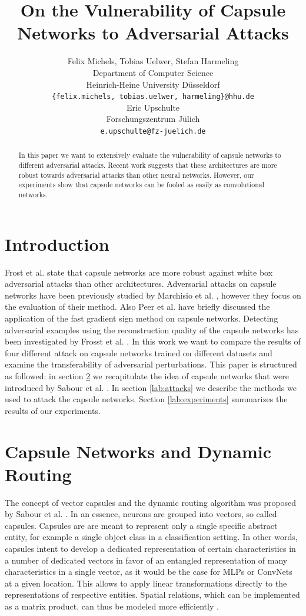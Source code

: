\documentclass{article}
\title{On the Vulnerability of Capsule Networks to Adversarial Attacks}
\author{%
  Felix Michels, Tobias Uelwer, Stefan Harmeling \\
  Department of Computer Science\\
  Heinrich-Heine University Düsseldorf\\
  \texttt{\{felix.michels, tobias.uelwer, harmeling\}@hhu.de} \\
  \And
  Eric Upschulte \\
  Forschungszentrum Jülich \\
  \texttt{e.upschulte@fz-juelich.de} \\
}
\begin{document}
\maketitle

\begin{abstract}
	In this paper we want to extensively evaluate the vulnerability of capsule networks to different adversarial attacks. Recent work suggests that these architectures are more robust towards adversarial attacks than other neural networks. However, our experiments show that capsule networks can be fooled as easily as convolutional networks.

\end{abstract}

\section{Introduction}

Frost et al. \cite{darccc} state that capsule networks are more robust against white box adversarial attacks than other architectures. Adversarial attacks on capsule networks have been previously studied by Marchisio et al. \cite{marchisio}, however they focus on the evaluation of their method. Also Peer et al. \cite{training} have briefly discussed the application of the fast gradient sign method \cite{fgsm} on capsule networks. Detecting adversarial examples using the reconstruction quality of the capsule networks has been investigated by Frosst et al. \cite{darccc}. In this work we want to compare the results of four different attack on capsule networks trained on different datasets and examine the transferability of adversarial perturbations. This paper is structured as followed: in section \ref{lab:capsules} we recapitulate the idea of capsule networks that were introduced by Sabour et al. \cite{capsules}. In section \ref{lab:attacks} we describe the methods we used to attack the capsule networks. Section \ref{lab:experiments} summarizes the results of our experiments.

\section{Capsule Networks and Dynamic Routing}
\label{lab:capsules}
The concept of vector capsules and the dynamic routing algorithm was proposed by Sabour et al. \cite{capsules}. In an essence, neurons are grouped into vectors, so called capsules. Capsules are are meant to represent only a single specific abstract entity, for example a single object class in a classification setting.
In other words, capsules intent to develop a dedicated representation of certain characteristics in a number of dedicated vectors in favor of an entangled representation of many characteristics in a single vector, as it would be the case for MLPs or ConvNets at a given location. This allows to apply linear transformations directly to the representations of respective entities. Spatial relations, which can be implemented as a matrix product, can thus be modeled more efficiently \cite{capsules}.
\end{document}
